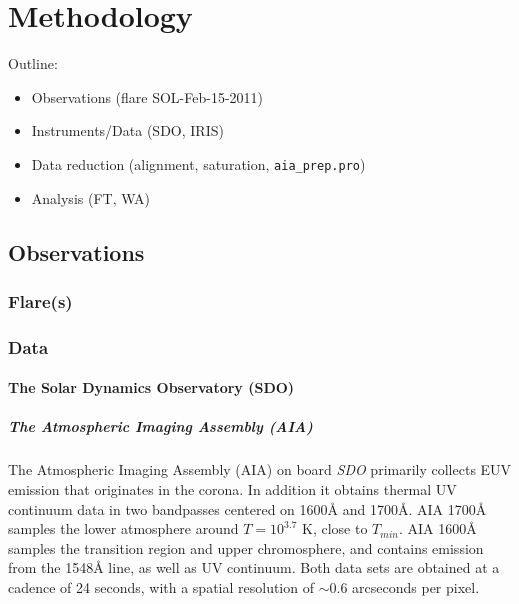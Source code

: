 \section{Methodology}


Outline:
\begin{itemize}
    \item Observations (flare SOL-Feb-15-2011)
    \item Instruments/Data (SDO, IRIS)
    \item Data reduction (alignment, saturation, \texttt{aia\_prep.pro})
    \item Analysis (FT, WA)
\end{itemize}

\subsection{Observations}


\subsubsection{Flare(s)}


\subsubsection{Data}

\paragraph{The Solar Dynamics Observatory (SDO)}

\subparagraph{The Atmospheric Imaging Assembly (AIA)}

The Atmospheric Imaging Assembly (AIA) \citep{Lemen2012, Boerner2012}
on board \textit{SDO} primarily collects EUV emission
that originates in the corona.
In addition it obtains thermal UV continuum data in
two bandpasses centered on 1600\AA{} and 1700\AA{}. AIA 1700\AA{} samples the
lower atmosphere around $T = 10^{3.7}$ K, close to $T_{min}$. AIA 1600\AA{}
samples the transition region and upper chromosphere, and contains emission
from the  1548\AA{} line, as well as UV continuum. Both data sets
are obtained at a cadence of 24 seconds, with a spatial resolution of $\sim$0.6
arcseconds per pixel.

